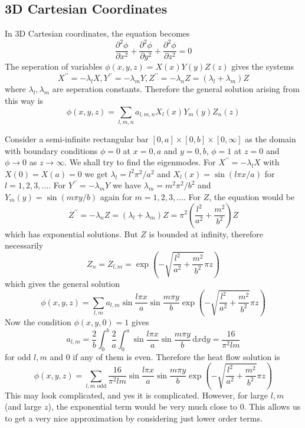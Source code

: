 \subsection{3D Cartesian Coordinates}
In 3D Cartesian coordinates, the equation becomes
$$\frac{\partial^2\phi}{\partial x^2}+\frac{\partial^2\phi}{\partial y^2}+\frac{\partial^2\phi}{\partial z^2}=0$$
The seperation of variables $\phi(x,y,z)=X(x)Y(y)Z(z)$ gives the systems
$$X^{\prime\prime}=-\lambda_lX,Y^{\prime\prime}=-\lambda_mY,Z^{\prime\prime}=-\lambda_nZ=(\lambda_l+\lambda_m)Z$$
where $\lambda_l,\lambda_m$ are seperation constants.
Therefore the general solution arising from this way is
$$\phi(x,y,z)=\sum_{l,m,n}a_{l,m,n}X_l(x)Y_m(y)Z_n(z)$$
\begin{example}
    Consider a semi-infinite rectangular bar $[0,a]\times [0,b]\times [0,\infty]$ as the domain with boundary conditions $\phi=0$ at $x=0,a$ and $y=0,b$, $\phi=1$ at $z=0$ and $\phi\to 0$ as $z\to\infty$.
    We shall try to find the eigenmodes.
    For $X^{\prime\prime}=-\lambda_lX$ with $X(0)=X(a)=0$ we get $\lambda_l=l^2\pi^2/a^2$ and $X_l(x)=\sin(l\pi x/a)$ for $l=1,2,3,\ldots$.
    For $Y^{\prime\prime}=-\lambda_mY$ we have $\lambda_m=m^2\pi^2/b^2$ and $Y_m(y)=\sin(m\pi y/b)$ again for $m=1,2,3,\ldots$.
    For $Z$, the equation would be
    $$Z^{\prime\prime}=-\lambda_nZ=(\lambda_l+\lambda_m)Z=\pi^2\left( \frac{l^2}{a^2}+\frac{m^2}{b^2} \right)Z$$
    which has exponential solutions.
    But $Z$ is bounded at infinity, therefore necessarily
    $$Z_n=Z_{l,m}=\exp\left( -\sqrt{\frac{l^2}{a^2}+\frac{m^2}{b^2}}\pi z \right)$$
    which gives the general solution
    $$\phi(x,y,z)=\sum_{l,m}a_{l,m}\sin\frac{l\pi x}{a}\sin\frac{m\pi y}{b}\exp\left( -\sqrt{\frac{l^2}{a^2}+\frac{m^2}{b^2}}\pi z \right)$$
    Now the condition $\phi(x,y,0)=1$ gives
    $$a_{l,m}=\frac{2}{b}\int_0^b\frac{2}{a}\int_0^a\sin\frac{l\pi x}{a}\sin\frac{m\pi y}{b}\,\mathrm dx\mathrm dy=\frac{16}{\pi^2lm}$$
    for odd $l,m$ and $0$ if any of them is even.
    Therefore the heat flow solution is
    $$\phi(x,y,z)=\sum_{l,m\text{ odd}}\frac{16}{\pi^2lm}\sin\frac{l\pi x}{a}\sin\frac{m\pi y}{b}\exp\left( -\sqrt{\frac{l^2}{a^2}+\frac{m^2}{b^2}}\pi z \right)$$
    This may look complicated, and yes it is complicated.
    However, for large $l,m$ (and large $z$), the exponential term would be very much close to $0$.
    This allows us to get a very nice approximation by considering just lower order terms.
\end{example}

